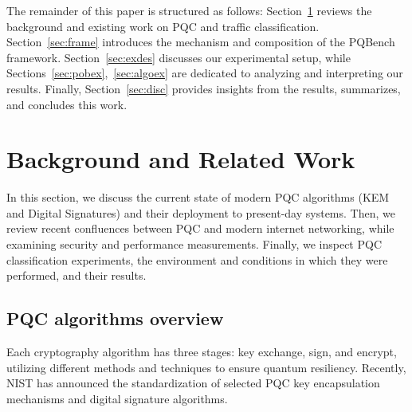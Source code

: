 \documentclass[10pt,journal]{IEEEtran}%
\begin{document}

The remainder of this paper is structured as follows: Section~\ref{sec:related} reviews the background and existing work on PQC and traffic classification. Section~\ref{sec:frame} introduces the mechanism and composition of the PQBench framework. Section~\ref{sec:exdes} discusses our experimental setup, while Sections~\ref{sec:pobex},~\ref{sec:algoex} are dedicated to analyzing and interpreting our results. Finally, Section~\ref{sec:disc} provides insights from the results, summarizes, and concludes this work.

\section{Background and Related Work}
\label{sec:related}

In this section, we discuss the current state of modern PQC algorithms (KEM and Digital Signatures) and their deployment to present-day systems. Then, we review recent confluences between PQC and modern internet networking, while examining security and performance measurements. Finally, we inspect PQC classification experiments, the environment and conditions in which they were performed, and their results.

\subsection{PQC algorithms overview}
Each cryptography algorithm has three stages: key exchange, sign, and encrypt, utilizing different methods and techniques to ensure quantum resiliency. Recently, NIST has announced the standardization of selected PQC key encapsulation mechanisms and digital signature algorithms. 
\end{document}
